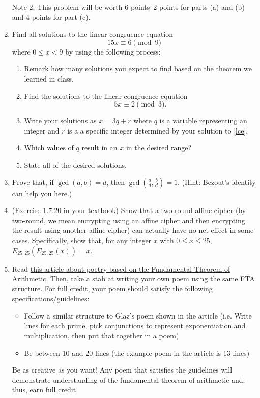 \documentclass[12pt]{article}
\begin{document}
\begin{enumerate}
Note 2: This problem will be worth 6 points--2 points for parts (a) and (b) and $4$ points for part (c).
\item Find all solutions to the linear congruence equation $$15x\equiv 6\pmod{9}$$ where $0\le x<9$ by using the following process:
\begin{enumerate}
\item Remark how many solutions you expect to find based on the theorem we learned in class.
\item Find the solutions to the linear congruence equation \begin{equation}\label{lce}
5x\equiv 2\pmod{3}.
\end{equation}
\item Write your solutions as $x=3q+r$ where $q$ is a variable representing an integer and $r$ is a a specific integer determined by your solution to \eqref{lce}.
\item Which values of $q$ result in an $x$ in the desired range?
\item State all of the desired solutions.
\end{enumerate}
\item Prove that, if $\gcd(a,b)=d$, then $\gcd(\frac{a}{d},\frac{b}{d})=1$.  (Hint: Bezout's identity can help you here.)
\item (Exercise 1.7.20 in your textbook) Show that a two-round affine cipher (by two-round, we mean encrypting using an affine cipher and then encrypting the result using another affine cipher) can actually have no net effect in some cases. Specifically, show that, for any integer $x$ with $0\le x\le 25$, $E_{25,25}(E_{25,25}(x))=x$. 
\item Read \href{https://blogs.scientificamerican.com/roots-of-unity/prime-factorization-as-verse/}{this article about poetry based on the Fundamental Theorem of Arithmetic}.  Then, take a stab at writing your own poem using the same FTA structure. For full credit, your poem should satisfy the following specifications/guidelines:
\begin{itemize}
\item Follow a similar structure to Glaz's poem shown in the article (i.e.  Write lines for each prime, pick conjunctions to represent exponentiation and multiplication, then put that together in a poem)
\item Be between 10 and 20 lines (the example poem in the article is 13 lines)
\end{itemize}
Be as creative as you want! Any poem that satisfies the guidelines will demonstrate understanding of the fundamental theorem of arithmetic and, thus, earn full credit. 
\end{enumerate}
\end{document}
